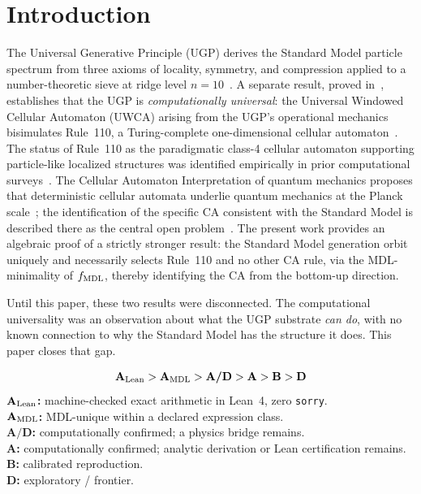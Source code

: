 \documentclass[11pt]{article}
\theoremstyle{remark}
\newcommand{\CatA}{\textbf{A}}
\newcommand{\CatAL}{\ensuremath{\textbf{A}_{\rm Lean}}}
\newcommand{\CatAMDL}{\ensuremath{\textbf{A}_{\rm MDL}}}
\newcommand{\CatAD}{\textbf{A/D}}
\newcommand{\CatB}{\textbf{B}}
\newcommand{\CatD}{\textbf{D}}
\begin{document}
{\small\tableofcontents}


\section{Introduction}
\label{sec:introduction}

The Universal Generative Principle (UGP) derives the Standard Model particle spectrum from
three axioms of locality, symmetry, and compression applied to a number-theoretic sieve
at ridge level $n=10$~\cite{Spivack2025_FirstPrinciplesSM}. A separate result, proved in~\cite{Spivack2025_UGPDynamicsUniversality},
establishes that the UGP is \emph{computationally universal}: the Universal Windowed
Cellular Automaton (UWCA) arising from the UGP's operational mechanics bisimulates
Rule~110, a Turing-complete one-dimensional cellular automaton~\cite{Cook2004,Cook2009}.
The status of Rule~110 as the paradigmatic class-4 cellular automaton supporting
particle-like localized structures was identified empirically in prior computational
surveys~\cite{Wolfram2020Tech}.
The Cellular Automaton Interpretation of quantum mechanics proposes that deterministic
cellular automata underlie quantum mechanics at the Planck scale~\cite{tHooft2016CA};
the identification of the specific CA consistent with the Standard Model is described
there as the central open problem~\cite[Sect.~8.1]{tHooft2016CA}.
The present work provides an algebraic proof of a strictly stronger result: the Standard
Model generation orbit uniquely and necessarily selects Rule~110 and no other CA rule,
via the MDL-minimality of $f_{\rm MDL}$, thereby identifying the CA from the bottom-up direction.

Until this paper, these two results were disconnected. The computational universality
was an observation about what the UGP substrate \emph{can do}, with no known connection to
why the Standard Model has the structure it does. This paper closes that gap.

\medskip

\begin{tcolorbox}[colback=gray!4,colframe=gray!50!black,
  title={\textbf{Claim-strength taxonomy}},
  fonttitle=\bfseries,left=6pt,right=6pt,top=5pt,bottom=5pt]
\footnotesize
\[
\CatAL > \CatAMDL > \CatAD > \CatA > \CatB > \CatD
\]
\small
\textbf{$\CatAL$:} machine-checked exact arithmetic in Lean~4, zero \texttt{sorry}.\\
\textbf{$\CatAMDL$:} MDL-unique within a declared expression class.\\
\textbf{$\CatAD$:} computationally confirmed; a physics bridge remains.\\
\textbf{$\CatA$:} computationally confirmed; analytic derivation or Lean
certification remains.\\
\textbf{$\CatB$:} calibrated reproduction.\\
\textbf{$\CatD$:} exploratory / frontier.
\end{tcolorbox}
\end{document}
